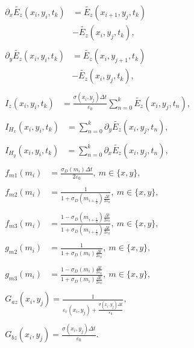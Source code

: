 \documentclass[12pt,twocolumn]{article}
\begin{document}
\begin{subequations}
\label{eq:substitutions}
\begin{align}
&\begin{aligned}
\partial_x\tilde{E_z}(x_i,y_i,t_k) &= \tilde{E_z}(x_{i+1},y_j,t_k)\\&-\tilde{E_z}(x_i,y_j,t_k),
\end{aligned}\\
&\begin{aligned}
\partial_y\tilde{E_z}(x_i,y_i,t_k) &= \tilde{E_z}(x_i,y_{j+1},t_k)\\&-\tilde{E_z}(x_i,y_j,t_k),
\end{aligned}\\
&\begin{aligned}
I_{z}(x_i,y_i,t_k) &= \frac{\sigma(x_i,y_j)\Delta t}{\varepsilon_0}\sum_{n=0}^k\tilde{E_z}(x_i,y_j,t_n),
\end{aligned}\\
&\begin{aligned}
I_{H_x}(x_i,y_i,t_k) &= \sum_{n=0}^k\partial_y\tilde{E_z}(x_i,y_j,t_n),
\end{aligned}\\
&\begin{aligned}
I_{H_y}(x_i,y_i,t_k) &= \sum_{n=0}^k\partial_x\tilde{E_z}(x_i,y_j,t_n),
\end{aligned}\\
&\begin{aligned}
f_{m1}(m_i) &= \frac{\sigma_D(m_i) \Delta t}{2\varepsilon_0},~m\in\{x,y\},
\end{aligned}\\
&\begin{aligned}
f_{m2}(m_i) &= \frac{1}{1+\sigma_D(m_{i+\frac{1}{2}})\frac{\Delta t}{2\varepsilon_0}},~m\in\{x,y\},
\end{aligned}\\
&\begin{aligned}
f_{m3}(m_i) &= \frac{1-\sigma_D(m_{i+\frac{1}{2}})\frac{\Delta t}{2\varepsilon_0}}{1+\sigma_D(m_{i+\frac{1}{2}})\frac{\Delta t}{2\varepsilon_0}},~m\in\{x,y\},
\end{aligned}\\
&\begin{aligned}
g_{m2}(m_i) &= \frac{1}{1+\sigma_D(m_{i})\frac{\Delta t}{2\varepsilon_0}},~m\in\{x,y\},
\end{aligned}\\
&\begin{aligned}
g_{m3}(m_i) &= \frac{1-\sigma_D(m_{i})\frac{\Delta t}{2\varepsilon_0}}{1+\sigma_D(m_{i})\frac{\Delta t}{2\varepsilon_0}},~m\in\{x,y\},
\end{aligned}\\
&\begin{aligned}
G_{az}(x_i,y_j) = \frac{1}{\varepsilon_r(x_i,y_j)+\frac{\sigma(x_i,y_j)\Delta t}{\varepsilon_0}},
\end{aligned}\\
&\begin{aligned}
G_{bz}(x_i,y_j) = \frac{\sigma(x_i,y_j)\Delta t}{\varepsilon_0}.
\end{aligned}
\end{align}
\end{subequations}
\end{document}

